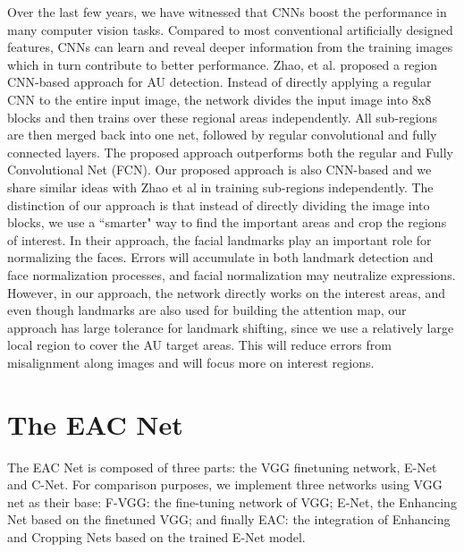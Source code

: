 \documentclass[a4paper, 10pt, conference]{ieeeconf}      %
\begin{document}
Over the last few years, we have witnessed that CNNs boost the performance in many computer vision tasks. Compared to most conventional artificially designed features, CNNs can learn and reveal deeper information from the training images which in turn contribute to better performance. Zhao, et al. \cite{p22} proposed a region CNN-based approach for AU detection. Instead of directly applying a regular CNN to the entire input image, the network divides the input image into 8x8 blocks and then trains over these regional areas independently. All sub-regions are then merged back into one net, followed by regular convolutional and fully connected layers. The proposed approach outperforms both the regular and Fully Convolutional Net (FCN).
Our proposed approach is also CNN-based and we share similar ideas with Zhao et al \cite{p22} in training sub-regions independently. The distinction of our approach is that instead of directly dividing the image into blocks, we use a ``smarter" way to find the important areas and crop the regions of interest. In their approach, the facial landmarks play an important role for normalizing the faces. Errors will accumulate in both landmark detection and face normalization processes, and facial normalization may neutralize expressions. However, in our approach, the network directly works on the interest areas, and even though landmarks are also used for building the attention map, our approach has large tolerance for landmark shifting, since we use a relatively large local region to cover the AU target areas. This will reduce errors from misalignment along images and will focus more on interest regions. 

\section{The EAC Net}

The EAC Net is composed of three parts: the VGG finetuning network, E-Net and C-Net. For comparison purposes, we implement three networks using VGG net as their base: F-VGG: the fine-tuning network of VGG; E-Net, the Enhancing Net based on the finetuned VGG; and finally EAC: the integration of Enhancing and Cropping Nets based on the trained E-Net model.
\end{document}
